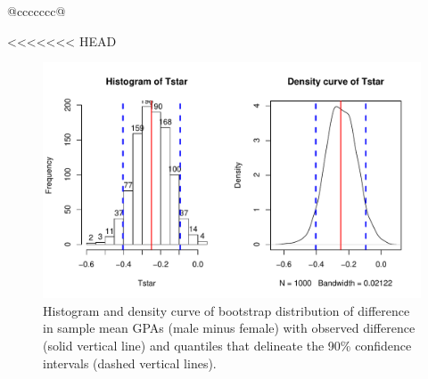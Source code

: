 \documentclass[]{book}
\newenvironment{Shaded}{\begin{snugshade}}{\end{snugshade}}
\newcommand{\KeywordTok}[1]{\textcolor[rgb]{0.13,0.29,0.53}{\textbf{#1}}}
\newcommand{\DataTypeTok}[1]{\textcolor[rgb]{0.13,0.29,0.53}{#1}}
\newcommand{\DecValTok}[1]{\textcolor[rgb]{0.00,0.00,0.81}{#1}}
\newcommand{\StringTok}[1]{\textcolor[rgb]{0.31,0.60,0.02}{#1}}
\newcommand{\OperatorTok}[1]{\textcolor[rgb]{0.81,0.36,0.00}{\textbf{#1}}}
\newcommand{\NormalTok}[1]{#1}
\theoremstyle{definition}
\theoremstyle{definition}
\theoremstyle{remark}
\begin{document}
\begin{longtable}[]{@{}ccccccc@{}}
\begin{minipage}[b]{0.10\columnwidth}
\begin{Shaded}
\begin{Highlighting}[]
\begin{Shaded}
\begin{Highlighting}[]
\begin{Shaded}
\begin{Highlighting}[]
\begin{Shaded}
\begin{Highlighting}[]
\begin{Shaded}
\begin{Highlighting}[]
\begin{Shaded}
\begin{Highlighting}[]
\begin{Shaded}
\begin{Highlighting}[]
<<<<<<< HEAD
\begin{figure}
\centering
\includegraphics{02-reintroductionToStatistics_files/figure-latex/Figure2-21-1.pdf}
\caption{\label{fig:Figure2-21}Histogram and density curve of bootstrap distribution of
difference in sample mean GPAs (male minus female) with observed
difference (solid vertical line) and quantiles that delineate the 90\%
confidence intervals (dashed vertical lines).}
\end{figure}

\begin{Shaded}
\end{Shaded}


\end{Highlighting}
\end{Shaded}
\end{Highlighting}
\end{Shaded}
\end{Highlighting}
\end{Shaded}
\end{Highlighting}
\end{Shaded}
\end{Highlighting}
\end{Shaded}
\end{Highlighting}
\end{Shaded}
\end{Highlighting}
\end{Shaded}
\end{minipage}
\end{longtable}
\end{document}
